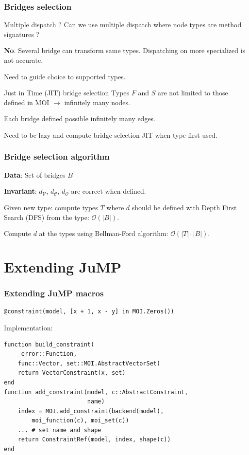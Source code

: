 \documentclass{beamer}
\begin{document}
\begin{frame}
  \frametitle{Bridges selection}

  \begin{block}{Multiple dispatch ?}
    Can we use multiple dispatch where node types are method signatures ?

    \textbf{No}.
    Several bridge can transform same types.
    Dispatching on more specialized is not accurate.

    Need to guide choice to supported types.
  \end{block}

  \begin{block}{Just in Time (JIT) bridge selection}
    Types $F$ and $S$ are \alert{not limited} to those defined in MOI $\to$
    \alert{infinitely} many nodes.

    Each bridge defined possible \alert{infinitely} many edges.

    Need to be \alert{lazy} and compute bridge selection JIT when
    type first used.
  \end{block}

\end{frame}

\begin{frame}
  \frametitle{Bridge selection algorithm}
  \textbf{Data}: Set of bridges $B$

  \textbf{Invariant}: $d_\mathcal{V}$, $d_\mathcal{C}$, $d_\mathcal{O}$
  are correct when defined.

  Given new type: compute types $T$ where $d$ should be defined with
  Depth First Search (DFS) from the type: $\mathcal{O}(|B|)$.

  Compute $d$ at the types using Bellman-Ford algorithm: $\mathcal{O}(|T| \cdot |B|)$.
\end{frame}

\section{Extending JuMP}

\begin{frame}[fragile]
  \frametitle{Extending JuMP macros}
\begin{verbatim}
@constraint(model, [x + 1, x - y] in MOI.Zeros())
\end{verbatim}
  Implementation:
\begin{verbatim}
function build_constraint(
    _error::Function,
    func::Vector, set::MOI.AbstractVectorSet)
    return VectorConstraint(x, set)
end
function add_constraint(model, c::AbstractConstraint,
                        name)
    index = MOI.add_constraint(backend(model),
        moi_function(c), moi_set(c))
    ... # set name and shape
    return ConstraintRef(model, index, shape(c))
end
\end{verbatim}
\end{frame}
\end{document}
